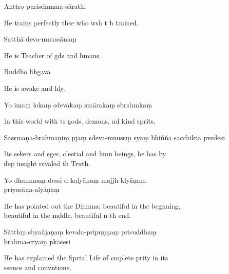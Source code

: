 Anttro purisdamma-sārathi

\begin{english}
  He trains perfectly thse who wsh t b trained.
\end{english}

Satthā deva-mnussānaṃ

\begin{english}
  He is Teacher of gds and hmans.
\end{english}

Buddho bhgavā

\begin{english}
  He is awake and hly.
\end{english}

Yo imaṃ lokaṃ sdevakaṃ smārakaṃ sbrahmkaṃ

\begin{english}
  In this world with ts gods, demons, nd kind sprits,
\end{english}

Sassmaṇa-brāhmaṇiṃ pjaṃ sdeva-mnussṃ syaṃ bhiññā sacchiktā pvedesi

\begin{english}
  Its sekers and sges, clestial and hmn beings, he has by \\d{}ep insight revaled th Truth.
\end{english}

Yo dhammaṃ dessi d-kalyāṇaṃ majjh-klyāṇaṃ \\p{}riyosāṇa-alyāṇaṃ

\begin{english}
  He has pointed out the Dhmma: beautiful in the begnning, \\beautiful in the mddle, beautiful n th end.
\end{english}

Sātthṃ sbyañjaṇaṃ kevala-pripuṇṇaṃ prisuddhaṃ \\brahma-cryaṃ pkāsesi

\begin{english}
  He has explained the Sprtal Life of cmplete prity in its \\ssence and convntions.
\end{english}

